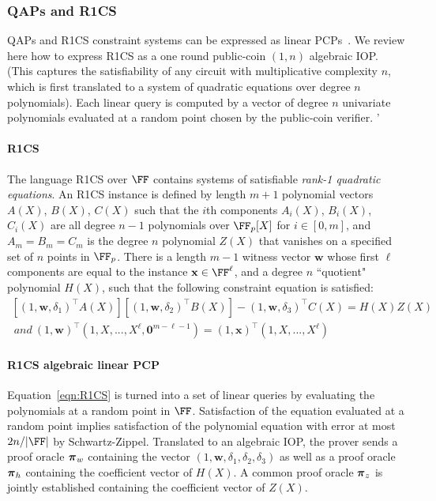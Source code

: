 \subsubsection{QAPs and R1CS} 

QAPs and R1CS constraint systems can be expressed as linear PCPs~\cite{TCC:BCIOP13,C:BCGTV13}. We review here how to express R1CS as a one round public-coin $(1, n)$ algebraic IOP. (This captures the satisfiability of any circuit with multiplicative complexity $n$, which is first translated to a system of quadratic equations over degree $n$ polynomials). Each linear query is computed by a vector of degree $n$ univariate polynomials evaluated at a random point chosen by the public-coin verifier. '

\paragraph{R1CS}  The language R1CS over $\FF$ contains systems of satisfiable \emph{rank-1 quadratic equations}. An R1CS instance is defined by length $m+1$ polynomial vectors $A(X)$, $B(X)$, $C(X)$ such that the $i$th components $A_i(X)$, $B_i(X)$, $C_i(X)$ are all degree $n-1$ polynomials over $\FF_p[X]$ for $i \in [0,m]$, and $A_m = B_m = C_m$ is the degree $n$ polynomial $Z(X)$ that vanishes on a specified set of $n$ points in $\FF_p$. There is a length $m-1$ witness vector $\mathbf{w}$ whose first $\ell$ components are equal to the instance $\mathbf{x} \in \FF^\ell$, and a degree $n$ ``quotient" polynomial $H(X)$, such that the following constraint equation is satisfied: 
\begin{equation} \label{eqn:R1CS} 
\begin{split}
[(1, \mathbf{w}, \delta_1)^\top A(X)][(1, \mathbf{w}, \delta_2)^\top B(X)] 
- (1, \mathbf{w}, \delta_3)^\top C(X) = H(X)Z(X) \\ 
\ and \ (1,\mathbf{w})^\top (1,X,...,X^{\ell}, \mathbf{0}^{m- \ell -1}) = (1,\mathbf{x})^\top (1, X,...,X^{\ell})
\end{split} 
\end{equation} 

\paragraph{R1CS algebraic linear PCP} Equation~\ref{eqn:R1CS} is turned into a set of linear queries by evaluating the polynomials at a random point in $\FF$. Satisfaction of the equation evaluated at a random point implies satisfaction of the polynomial equation with error at most $2n / |\FF|$ by Schwartz-Zippel. Translated to an algebraic IOP, the prover sends a proof oracle $\boldsymbol{\pi}_w$ containing the vector $(1, \mathbf{w}, \delta_1, \delta_2, \delta_3)$ as well as a proof oracle $\boldsymbol{\pi}_h$ containing the coefficient vector of $H(X)$. A common proof oracle $\boldsymbol{\pi}_z$ is jointly established containing the coefficient vector of $Z(X)$. 


